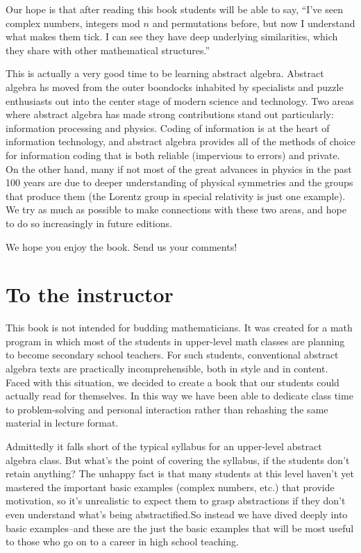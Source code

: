 Our hope is that after reading this book students will be able to say, ``I've seen complex numbers, integers mod $n$ and permutations before, but now I understand what makes them tick. I can see they have  deep underlying similarities, which they share with other mathematical structures.'' 

This is actually a very good time to be learning abstract algebra. Abstract algebra hs moved from the outer boondocks inhabited by specialists and puzzle enthusiasts out  into the center stage of modern  science and technology. Two areas where abstract algebra has made strong contributions stand out particularly: information processing and physics. Coding of information is at the heart of information technology, and abstract algebra provides all of the methods of choice for information coding that is both reliable (impervious to errors) and private.  
On the other hand,  many if not most of the great advances in  physics in the past 100 years are due to deeper understanding of physical symmetries and the groups that produce them (the Lorentz group in special relativity is just one example). We try as much as possible to make connections with these two areas, and hope to do so increasingly in future editions. 

We hope you enjoy the book. Send us your comments!

\section*{To the instructor}

This book  is not intended for budding mathematicians. It was created for a math program in which most of the students in upper-level math classes are planning to become secondary school teachers. For such students, conventional abstract algebra texts are practically  incomprehensible, both in style and in content. Faced with this situation, we decided to create a book that our students could actually read for themselves. In this way we have been able to dedicate class time to problem-solving and personal  interaction rather than rehashing the same material in lecture format.

Admittedly it falls short of the typical syllabus for an upper-level abstract algebra class. But what's the point of covering the syllabus, if the students don't retain anything?  The unhappy fact is that many students at this level haven't yet mastered the important basic examples (complex numbers, etc.) that provide motivation, so it's unrealistic to expect them to grasp abstractions if they don't even understand what's being abstractified.So instead we have dived deeply into basic examples--and these are the just the basic examples that will be most useful to those who go on to a career in high school teaching.

